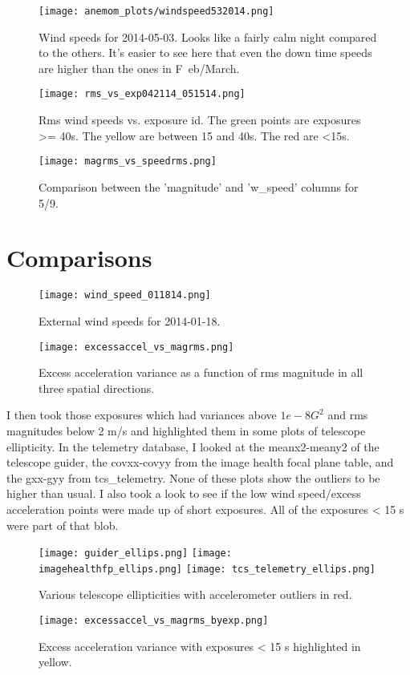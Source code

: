 \documentclass{article}
\begin{document}
\begin{figure}[h!]
  \centering
  \texttt{[image: anemom\_plots/windspeed532014.png]}
  \caption{Wind speeds for 2014-05-03. Looks like a fairly calm night compared to the others. It's easier to see here that even the down time speeds are higher than the ones in F\
eb/March.}
\end{figure}

\begin{figure}[h!]
  \centering
  \texttt{[image: rms\_vs\_exp042114\_051514.png]}
  \caption{Rms wind speeds vs. exposure id. The green points are exposures >= 40s. The yellow are between 15 and 40s. The red are <15s. }
\end{figure}

\begin{figure}[h!]
  \centering
  \texttt{[image: magrms\_vs\_speedrms.png]}
  \caption{Comparison between the 'magnitude' and 'w_speed' columns for 5/9.}
\end{figure}

\section{Comparisons}

\begin{figure}[h!]
  \centering
  \texttt{[image: wind\_speed\_011814.png]}
  \caption{External wind speeds for 2014-01-18.}
\end{figure}

\begin{figure}[h!]
  \centering
  \texttt{[image: excessaccel\_vs\_magrms.png]}
  \caption{Excess acceleration variance as a function of rms magnitude in all three spatial directions.}
\end{figure}

I then took those exposures which had variances above $1e-8 G^{2}$ and rms magnitudes below 2 m/s and highlighted them in some plots of telescope ellipticity.
In the telemetry database, I looked at the meanx2-meany2 of the telescope guider, the covxx-covyy from the image health focal plane table, and the gxx-gyy from tcs\_telemetry.
None of these plots show the outliers to be higher than usual. 
I also took a look to see if the low wind speed/excess acceleration points were made up of short exposures. 
All of the exposures < 15 s were part of that blob. 

\begin{figure}[h!]
  \centering
  \texttt{[image: guider\_ellips.png]}
  \texttt{[image: imagehealthfp\_ellips.png]}
  \texttt{[image: tcs\_telemetry\_ellips.png]}
  \caption{Various telescope ellipticities with accelerometer outliers in red.}
\end{figure}

\begin{figure}[h!]
  \centering
  \texttt{[image: excessaccel\_vs\_magrms\_byexp.png]}
  \caption{Excess acceleration variance with exposures < 15 s highlighted in yellow.}
\end{figure}
\end{document}
